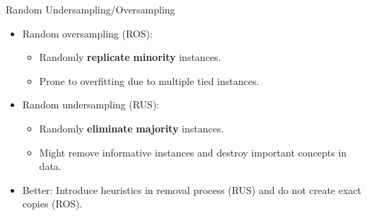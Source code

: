 \documentclass[11pt,compress,t,notes=noshow, aspectratio=169, xcolor=table]{beamer}
\begin{document}
\begin{frame}{Random Undersampling/Oversampling}

    \begin{itemize}
        \item Random oversampling (ROS):
        \begin{itemize}
            \item Randomly \textbf{replicate} \textbf{minority} instances.%
            \item Prone to overfitting due to multiple tied instances.
        \end{itemize}

        \item Random undersampling (RUS):
        \begin{itemize}
            \item Randomly \textbf{eliminate} \textbf{majority} instances. %
            \item Might remove informative instances and destroy important concepts in data.
        \end{itemize}

        \item Better: Introduce heuristics in removal process (RUS) and do not create exact copies (ROS).
    
        \end{itemize}	

\end{frame}
	
\end{document}
